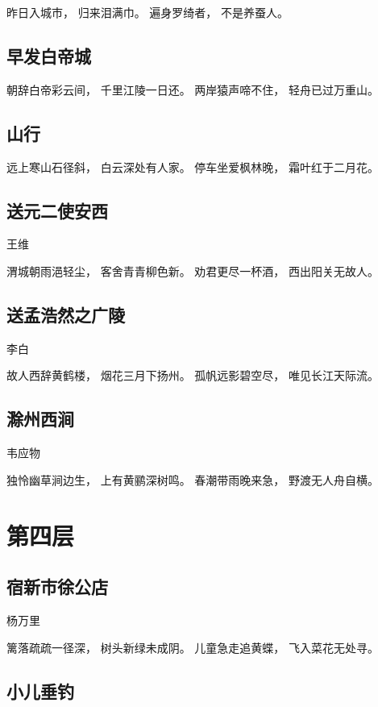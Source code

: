 \documentclass[12pt,UTF8]{ctexbook}
\begin{document}
昨日入城市，
归来泪满巾。
遍身罗绮者，
不是养蚕人。

\section{早发白帝城}

朝辞白帝彩云间，
千里江陵一日还。
两岸猿声啼不住，
轻舟已过万重山。

\section{山行}

远上寒山石径斜，
白云深处有人家。
停车坐爱枫林晚，
霜叶红于二月花。

\section{送元二使安西}

王维

渭城朝雨浥轻尘，
客舍青青柳色新。
劝君更尽一杯酒，
西出阳关无故人。

\section{送孟浩然之广陵}

李白

故人西辞黄鹤楼，
烟花三月下扬州。
孤帆远影碧空尽，
唯见长江天际流。

\section{滁州西涧}

韦应物

独怜幽草涧边生，
上有黄鹂深树鸣。
春潮带雨晚来急，
野渡无人舟自横。

\chapter{第四层}

\section{宿新市徐公店}

杨万里

篱落疏疏一径深，
树头新绿未成阴。
儿童急走追黄蝶，
飞入菜花无处寻。

\section{小儿垂钓}
\end{document}
